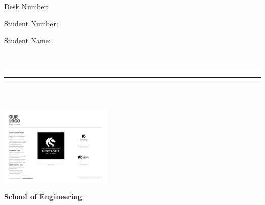 \documentclass[a4paper,12pt]{article}
\newcommand{\school}{School of Engineering} %
\begin{document}


\begin{doublespace}

  \vspace*{-10mm}


  \begin{minipage}[t]{0.23\linewidth}
    
    \footnotesize

    Desk Number:

    \vspace{0.5mm}

    Student Number:

    \vspace{0.5mm}

    Student Name: 

    {\ }
  \end{minipage}  \begin{minipage}[t]{0.4\linewidth}
    
    \footnotesize

    \rule{2cm}{0.2mm}

    \vspace{0.5mm}

    \rule{5cm}{0.2mm}

    \vspace{0.5mm}

    \rule{5cm}{0.2mm}

    {\ }
  \end{minipage}\hfill
  \begin{minipage}[b]{3.78cm}
    \hspace*{10mm}\includegraphics[height=3.78cm]{uon_logo_black_square.pdf}
    \vspace*{-3.78cm}
  \end{minipage}


  \vspace{20mm}



  \begin{center}
    \textbf{\large \school}

    \vspace{1mm}


\end{center}
\end{doublespace}
\end{document}
